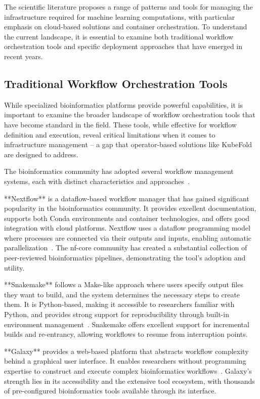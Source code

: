 The scientific literature proposes a range of patterns and tools for managing the infrastructure required for machine learning computations, with particular emphasis on cloud-based solutions and container orchestration.
To understand the current landscape, it is essential to examine both traditional workflow orchestration tools and specific deployment approaches that have emerged in recent years.

\subsection{Traditional Workflow Orchestration Tools}

While specialized bioinformatics platforms provide powerful capabilities, it is important to examine the broader landscape of workflow orchestration tools that have become standard in the field.
These tools, while effective for workflow definition and execution, reveal critical limitations when it comes to infrastructure management -- a gap that operator-based solutions like KubeFold are designed to address.

The bioinformatics community has adopted several workflow management systems, each with distinct characteristics and approaches~\cite{workflows_review_nature}.

**Nextflow** is a dataflow-based workflow manager that has gained significant popularity in the bioinformatics community.
It provides excellent documentation, supports both Conda environments and container technologies, and offers good integration with cloud platforms.
Nextflow uses a dataflow programming model where processes are connected via their outputs and inputs, enabling automatic parallelization~\cite{nextflow}.
The nf-core community has created a substantial collection of peer-reviewed bioinformatics pipelines, demonstrating the tool's adoption and utility.

**Snakemake** follows a Make-like approach where users specify output files they want to build, and the system determines the necessary steps to create them.
It is Python-based, making it accessible to researchers familiar with Python, and provides strong support for reproducibility through built-in environment management~\cite{snakemake}.
Snakemake offers excellent support for incremental builds and re-entrancy, allowing workflows to resume from interruption points.

**Galaxy** provides a web-based platform that abstracts workflow complexity behind a graphical user interface.
It enables researchers without programming expertise to construct and execute complex bioinformatics workflows~\cite{galaxy}.
Galaxy's strength lies in its accessibility and the extensive tool ecosystem, with thousands of pre-configured bioinformatics tools available through its interface.

